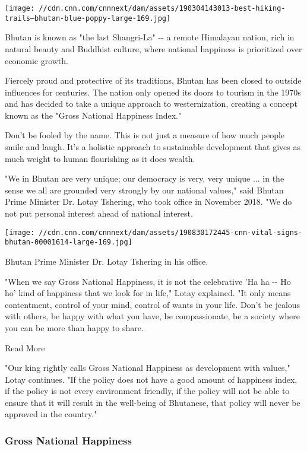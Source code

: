 \texttt{[image: //cdn.cnn.com/cnnnext/dam/assets/190304143013-best-hiking-trails---bhutan-blue-poppy-large-169.jpg]}

Bhutan is known as "the last Shangri-La" -\/- a remote Himalayan nation,
rich in natural beauty and Buddhist culture, where national happiness is
prioritized over economic growth.

Fiercely proud and protective of its traditions, Bhutan has been closed
to outside influences for centuries. The nation only opened its doors to
tourism in the 1970s and has decided to take a unique approach to
westernization, creating a concept known as the "Gross National
Happiness Index."

Don't be fooled by the name. This is not just a measure of how much
people smile and laugh. It's a holistic approach to sustainable
development that gives as much weight to human flourishing as it does
wealth.

"We in Bhutan are very unique; our democracy is very, very unique ... in
the sense we all are grounded very strongly by our national values,"
said Bhutan Prime Minister Dr. Lotay Tshering, who took office in
November 2018. "We do not put personal interest ahead of national
interest.

\texttt{[image: //cdn.cnn.com/cnnnext/dam/assets/190830172445-cnn-vital-signs-bhutan-00001614-large-169.jpg]}

Bhutan Prime Minister Dr. Lotay Tshering in his office.

"When we say Gross National Happiness, it is not the celebrative 'Ha ha
-\/- Ho ho' kind of happiness that we look for in life," Lotay
explained. "It only means contentment, control of your mind, control of
wants in your life. Don't be jealous with others, be happy with what you
have, be compassionate, be a society where you can be more than happy to
share.

Read More

"Our king rightly calls Gross National Happiness as development with
values," Lotay continues. "If the policy does not have a good amount of
happiness index, if the policy is not every environment friendly, if the
policy will not be able to ensure that it will result in the well-being
of Bhutanese, that policy will never be approved in the country."

\hypertarget{gross-national-happiness}{%
\subsubsection{Gross National
Happiness}\label{gross-national-happiness}}

